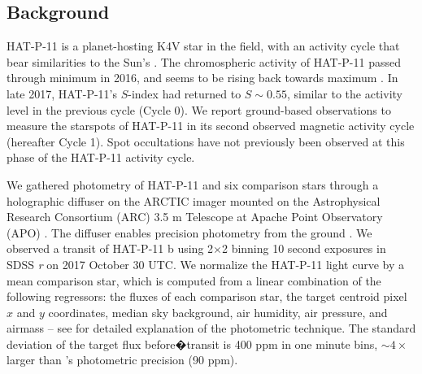 

\newcommand{\sdssr}{SDSS \textsl{r}\xspace}

% 







\subsection{Background}
HAT-P-11 is a planet-hosting K4V star in the \kepler field, with an activity cycle that bear similarities to the Sun's \citep{bakos2010, Sanchis-Ojeda2011, Morris2017a}. The chromospheric activity of HAT-P-11 passed through minimum in 2016, and seems to be rising back towards maximum \citep{Morris2017b}. In late 2017, HAT-P-11's $S$-index had returned to $S\sim0.55$, similar to the activity level in the previous cycle (Cycle 0). We report ground-based observations to measure the starspots of HAT-P-11 in its second observed magnetic activity cycle (hereafter Cycle 1). Spot occultations have not previously been observed at this phase of the HAT-P-11 activity cycle.  


We gathered photometry of HAT-P-11 and six comparison stars through a holographic diffuser on the ARCTIC imager mounted on the Astrophysical Research Consortium (ARC) 3.5 m Telescope at Apache Point Observatory (APO) \citep{Huehnerhoff2016}. The diffuser enables precision photometry from the ground \citep{Stefansson2017}. We observed a transit of HAT-P-11 b using 2$\times$2 binning 10 second exposures in \sdssr on 2017 October 30 UTC. We normalize the HAT-P-11 light curve by a mean comparison star, which is computed from a linear combination of the following regressors: the fluxes of each comparison star, the target centroid pixel $x$ and $y$ coordinates, median sky background, air humidity, air pressure, and airmass -- see \citet{Morris2018a} for detailed explanation of the photometric technique. The standard deviation of the target flux before�transit is 400 ppm in one minute bins, $\sim4\times$ larger than \kepler's photometric precision (90 ppm).

